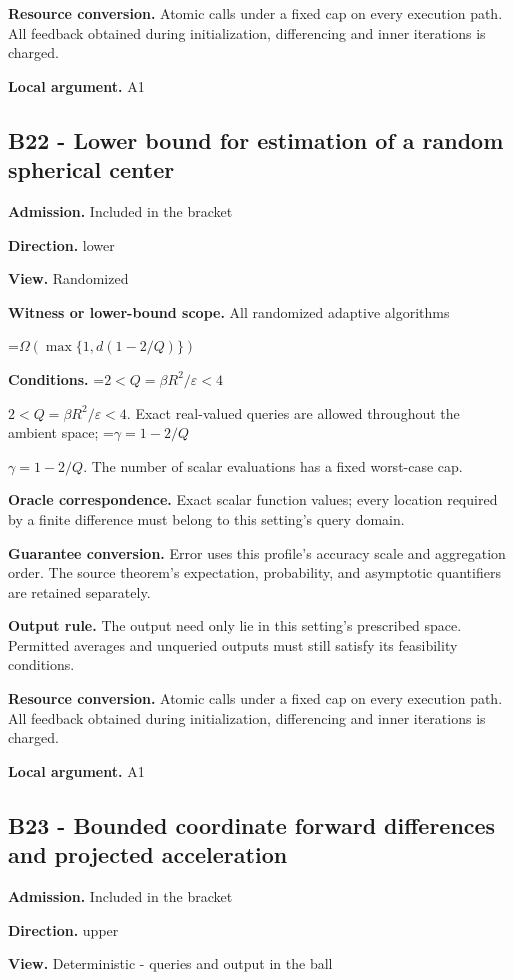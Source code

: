\documentclass[10pt,a4paper]{article}
\newcommand{\AtlasMath}[1]{\par\begingroup\centering\setbox0=\hbox{$\displaystyle #1$}\ifdim\wd0>1.4\linewidth\typeout{ATLAS WIDE FORMULA: \the\wd0}\fi\ifdim\wd0>\linewidth\resizebox{\linewidth}{!}{\box0}\else\box0\fi\par\endgroup}
\newcommand{\AtlasInlineMath}[1]{\begingroup\setbox0=\hbox{$#1$}\ifdim\wd0>.4\linewidth\endgroup\AtlasMath{#1}\else\endgroup$#1$\fi}
\begin{document}
\textbf{Resource conversion.} Atomic calls under a fixed cap on every execution path. All feedback obtained during initialization, differencing and inner iterations is charged.

\textbf{Local argument.} A1

\subsection{B22 - Lower bound for estimation of a random spherical center}
\textbf{Admission.} Included in the bracket

\textbf{Direction.} lower

\textbf{View.} Randomized

\textbf{Witness or lower-bound scope.} All randomized adaptive algorithms

\AtlasMath{\Omega(\max\{1,d(1-2/Q)\})}
\textbf{Conditions.} \AtlasInlineMath{2<Q=\beta R^2/\varepsilon<4}. Exact real-valued queries are allowed throughout the ambient space; \AtlasInlineMath{\gamma=1-2/Q}. The number of scalar evaluations has a fixed worst-case cap.

\textbf{Oracle correspondence.} Exact scalar function values; every location required by a finite difference must belong to this setting's query domain.

\textbf{Guarantee conversion.} Error uses this profile's accuracy scale and aggregation order. The source theorem's expectation, probability, and asymptotic quantifiers are retained separately.

\textbf{Output rule.} The output need only lie in this setting's prescribed space. Permitted averages and unqueried outputs must still satisfy its feasibility conditions.

\textbf{Resource conversion.} Atomic calls under a fixed cap on every execution path. All feedback obtained during initialization, differencing and inner iterations is charged.

\textbf{Local argument.} A1

\subsection{B23 - Bounded coordinate forward differences and projected acceleration}
\textbf{Admission.} Included in the bracket

\textbf{Direction.} upper

\textbf{View.} Deterministic - queries and output in the ball
\end{document}
